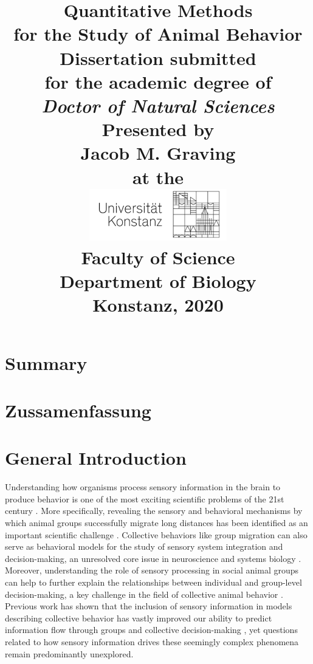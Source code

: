 \documentclass[11pt,a4paper,oneside]{article}
\title{
	\LARGE \textbf{Quantitative Methods} \\
	\LARGE \textbf{for the Study of Animal Behavior} \\
	\vspace{4cm}
	\Large Dissertation submitted \\
	\Large for the academic degree of \\
	\vspace{0.5cm}
	\Large \textit{Doctor of Natural Sciences} \\

	\vspace{2cm}
    \Large Presented by \\
    \vspace{0.5cm}
    \LARGE Jacob M. Graving \\
    \vspace{0.5cm}
    \Large at the \\
    \vspace{0.1cm}
	\includegraphics[width=6cm]{Graving_IMPRS_Thesis/graphics/uni_logo.png}\\
	\vspace{2cm}
	\Large Faculty of Science \\
	\Large Department of Biology \\
	\vspace{2cm}
	\Large Konstanz, 2020
	\date{}
}
\begin{document}
	\maketitle
    \newpage
	\tableofcontents
	\newpage
	\label{listoffigures}
	\listoffigures
	\newpage
	\setcounter{page}{1}
	\section{Summary}
	\newpage
	\section{Zussamenfassung}
	\newpage
	\section{General Introduction}
	\par
	Understanding how organisms process sensory information in the brain to produce behavior is one of the most exciting scientific problems of the 21st century \citep{anderson2014competho}. More specifically, revealing the sensory and behavioral mechanisms by which animal groups successfully migrate long distances has been identified as an important scientific challenge \citep{kennedy2005don,miller2005biological}. Collective behaviors like group migration can also serve as behavioral models for the study of sensory system integration and decision-making, an unresolved core issue in neuroscience and systems biology \citep{gold2007neural}. Moreover, understanding the role of sensory processing in social animal groups can help to further explain the relationships between individual and group-level decision-making, a key challenge in the field of collective animal behavior \citep{croft2008exploring,couzin2007collective}. Previous work has shown that the inclusion of sensory information in models describing collective behavior has vastly improved our ability to predict information flow through groups and collective decision-making \citep{bazazi2008collective,strandburg2013visual,strandburg2017habitat,rosenthal2015network,twomey2016vision}, yet questions related to how sensory information drives these seemingly complex phenomena remain predominantly unexplored.
	\par
\end{document}
